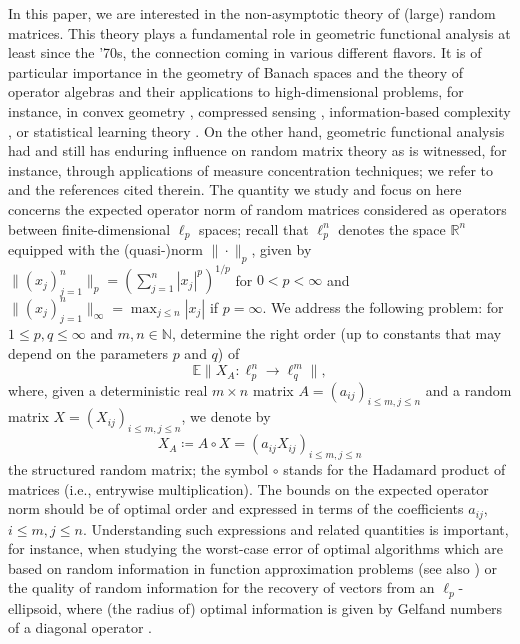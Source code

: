 \documentclass[a4paper]{amsart}
\theoremstyle{definition}
\theoremstyle{remark}
\numberwithin{equation}{section}
\newcommand*{\RR}{\mathbb{R}}
\newcommand*{\NN}{\mathbb{N}}
\newcommand*{\EE}{\mathbb{E}}
\newcommand*{\hadprod}{\mathbin{\circ}} %
\begin{document}
In this paper, we are interested in the non-asymptotic theory of (large) random matrices. This theory plays a fundamental role in geometric functional analysis at least since the '70s, the connection coming in various different flavors. It is of particular importance in the geometry of Banach spaces and the theory of operator algebras \cite{BGN,BG1981,DS2001,Gl1983,G1985,HPV2021} and their applications to high-dimensional problems, for instance, in convex geometry \cite{FY2019,GLSW2002}, compressed sensing \cite{CGLP2012,FR2013,Rau2010,V2012}, information-based complexity \cite{HKNPUsurvey,HKNPU2021}, or statistical learning theory \cite{RV2007,V2018}. On the other hand, geometric functional analysis had and still has enduring influence on random matrix theory as is witnessed, for instance, through applications of measure concentration techniques; we refer to \cite{DS2001,L2007} and the references cited therein.
The quantity we  study and focus on here concerns the expected operator norm of random matrices considered as operators between finite-dimensional $\ell_p$ spaces; recall that $\ell_p^n$ denotes the space $\RR^n$ equipped with the (quasi-)norm $\|\cdot\|_p$, given by $\|(x_j)_{j=1}^n\|_p = (\sum_{j=1}^n |x_j|^p)^{1/p}$ for $0<p<\infty$ and $\|(x_j)_{j=1}^n\|_\infty = \max_{j\le n}|x_j|$ if $p=\infty$. We address the following problem:
for $1 \leq p,q \leq \infty$ and $m,n\in\NN$, determine the right order (up to constants that may depend on the parameters $p$ and $q$) of
 \[
 \EE\| X_A\colon \ell^n_p \to \ell^m_q\|,
 \]
where, given a deterministic real $m\times n$ matrix $A = (a_{ij})_{i\leq m, j\leq n}$
and a random matrix $X = (X_{ij})_{i\leq m, j\leq n}$, we denote by
\[
X_A \coloneqq A\hadprod X = (a_{ij} X_{ij})_{i\leq m, j\leq n}
\]
the structured random matrix; the symbol $\hadprod$ stands for the Hadamard product of matrices (i.e., entrywise multiplication).
The bounds on the expected operator norm should be of optimal order and expressed in terms of the coefficients $a_{ij}$, $i\leq m,j\leq n$. Understanding such expressions and related quantities is important, for instance, when studying the worst-case error of optimal algorithms which are based on random information in function approximation problems \cite{HKNPU2021} (see also \cite{KU2021}) or the quality of random information for the recovery of vectors from an $\ell_p$-ellipsoid, where (the radius of) optimal information is given by Gelfand numbers of a diagonal operator \cite{HPS2021}.
\end{document}
